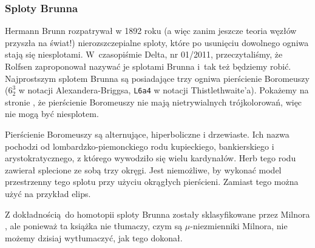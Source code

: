 \subsubsection{Sploty Brunna}
%
Hermann Brunn \cite{brunn1892} rozpatrywał w 1892 roku (a więc zanim jeszcze teoria węzłów przyszła na świat!) nierozszczepialne sploty, które po usunięciu dowolnego ogniwa stają się niesplotami.
%
W~czasopiśmie Delta, nr 01/2011, przeczytaliśmy, że Rolfsen zaproponował nazywać je splotami Brunna i~tak też będziemy robić.
Najprostszym splotem Brunna są posiadające trzy ogniwa pierścienie Boromeuszy ($6_2^3$ w notacji Alexandera-Briggsa, \texttt{L6a4} w notacji Thistlethwaite'a).
%
Pokażemy na stronie \pageref{boromean_not_splittable}, że pierścienie Boromeuszy nie mają nietrywialnych trójkolorowań, więc nie mogą być niesplotem.

Pierścienie Boromeuszy są alternujące, hiperboliczne i drzewiaste.
%
%
%
Ich nazwa pochodzi od lombardzko-piemonckiego rodu kupieckiego, bankierskiego i arystokratycznego, z którego wywodziło się wielu kardynałów.
Herb tego rodu zawierał splecione ze sobą trzy okręgi.
Jest niemożliwe, by wykonać model przestrzenny tego splotu przy użyciu okrągłych pierścieni.
Zamiast tego można użyć na przykład elips.

Z dokładnością do homotopii sploty Brunna zostały sklasyfikowane przez Milnora \cite{milnor1954}, ale ponieważ ta książka nie tłumaczy, czym są $\mu$-niezmienniki Milnora, nie możemy dzisiaj wytłumaczyć, jak tego dokonał.
%
%